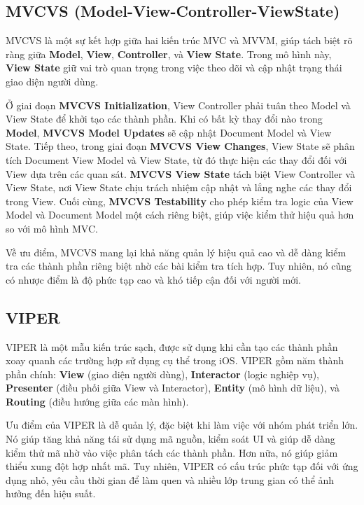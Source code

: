   \subsection{MVCVS (Model-View-Controller-ViewState)}

MVCVS là một sự kết hợp giữa hai kiến trúc MVC và MVVM, giúp tách biệt rõ ràng giữa \textbf{Model}, \textbf{View}, \textbf{Controller}, và \textbf{View State}. Trong mô hình này, \textbf{View State} giữ vai trò quan trọng trong việc theo dõi và cập nhật trạng thái giao diện người dùng.

\vspace{0.5em}

  Ở giai đoạn \textbf{MVCVS Initialization}, View Controller phải tuân theo Model và View State để khởi tạo các thành phần. Khi có bất kỳ thay đổi nào trong \textbf{Model}, \textbf{MVCVS Model Updates} sẽ cập nhật Document Model và View State. Tiếp theo, trong giai đoạn \textbf{MVCVS View Changes}, View State sẽ phân tích Document View Model và View State, từ đó thực hiện các thay đổi đối với View dựa trên các quan sát. \textbf{MVCVS View State} tách biệt View Controller và View State, nơi View State chịu trách nhiệm cập nhật và lắng nghe các thay đổi trong View. Cuối cùng, \textbf{MVCVS Testability} cho phép kiểm tra logic của View Model và Document Model một cách riêng biệt, giúp việc kiểm thử hiệu quả hơn so với mô hình MVC.
  
  \vspace{0.5em}

  Về ưu điểm, MVCVS mang lại khả năng quản lý hiệu quả cao và dễ dàng kiểm tra các thành phần riêng biệt nhờ các bài kiểm tra tích hợp. Tuy nhiên, nó cũng có nhược điểm là độ phức tạp cao và khó tiếp cận đối với người mới.

  \subsection{VIPER}

VIPER là một mẫu kiến trúc sạch, được sử dụng khi cần tạo các thành phần xoay quanh các trường hợp sử dụng cụ thể trong iOS. VIPER gồm năm thành phần chính: \textbf{View} (giao diện người dùng), \textbf{Interactor} (logic nghiệp vụ), \textbf{Presenter} (điều phối giữa View và Interactor), \textbf{Entity} (mô hình dữ liệu), và \textbf{Routing} (điều hướng giữa các màn hình).

\vspace{0.5em}

  Ưu điểm của VIPER là dễ quản lý, đặc biệt khi làm việc với nhóm phát triển lớn. Nó giúp tăng khả năng tái sử dụng mã nguồn, kiểm soát UI và giúp dễ dàng kiểm thử mã nhờ vào việc phân tách các thành phần. Hơn nữa, nó giúp giảm thiểu xung đột hợp nhất mã. Tuy nhiên, VIPER có cấu trúc phức tạp đối với ứng dụng nhỏ, yêu cầu thời gian để làm quen và nhiều lớp trung gian có thể ảnh hưởng đến hiệu suất.

